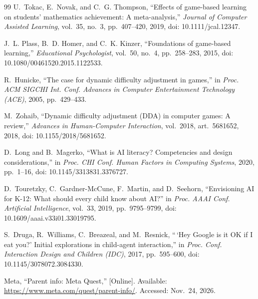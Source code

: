 \documentclass[conference]{IEEEtran}
\begin{document}
\begin{thebibliography}{99}
U.~Tokac, E.~Novak, and C.~G. Thompson, ``Effects of game-based learning on students' mathematics achievement: A meta-analysis,'' \emph{Journal of Computer Assisted Learning}, vol.~35, no.~3, pp.~407--420, 2019, doi: 10.1111/jcal.12347.

J.~L. Plass, B.~D. Homer, and C.~K. Kinzer, ``Foundations of game-based learning,'' \emph{Educational Psychologist}, vol.~50, no.~4, pp.~258--283, 2015, doi: 10.1080/00461520.2015.1122533.

R.~Hunicke, ``The case for dynamic difficulty adjustment in games,'' in \emph{Proc. ACM SIGCHI Int. Conf. Advances in Computer Entertainment Technology (ACE)}, 2005, pp.~429--433.

M.~Zohaib, ``Dynamic difficulty adjustment (DDA) in computer games: A review,'' \emph{Advances in Human-Computer Interaction}, vol.~2018, art.~5681652, 2018, doi: 10.1155/2018/5681652.

D.~Long and B.~Magerko, ``What is AI literacy? Competencies and design considerations,'' in \emph{Proc. CHI Conf. Human Factors in Computing Systems}, 2020, pp.~1--16, doi: 10.1145/3313831.3376727.

D.~Touretzky, C.~Gardner-McCune, F.~Martin, and D.~Seehorn, ``Envisioning AI for K-12: What should every child know about AI?'' in \emph{Proc. AAAI Conf. Artificial Intelligence}, vol.~33, 2019, pp.~9795--9799, doi: 10.1609/aaai.v33i01.33019795.

S.~Druga, R.~Williams, C.~Breazeal, and M.~Resnick, ``\,`Hey Google is it OK if I eat you?' Initial explorations in child-agent interaction,'' in \emph{Proc. Conf. Interaction Design and Children (IDC)}, 2017, pp.~595--600, doi: 10.1145/3078072.3084330.

Meta, ``Parent info: Meta Quest,'' [Online]. Available: \url{https://www.meta.com/quest/parent-info/}. Accessed: Nov.~24, 2026.

\end{thebibliography}
\end{document}
